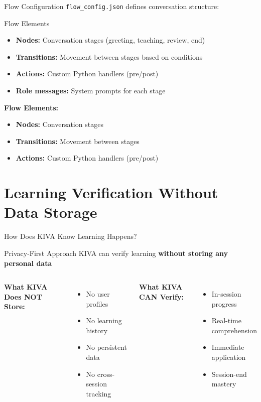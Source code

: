 \documentclass[aspectratio=169]{beamer}
\begin{document}
\begin{frame}{Flow Configuration}
\texttt{flow\_config.json} defines conversation structure:

\begin{block}{Flow Elements}
\begin{itemize}
    \item \textbf{Nodes:} Conversation stages (greeting, teaching, review, end)
    \item \textbf{Transitions:} Movement between stages based on conditions
    \item \textbf{Actions:} Custom Python handlers (pre/post)
    \item \textbf{Role messages:} System prompts for each stage
\end{itemize}
\end{block}

\vspace{0.3cm}
\textbf{Flow Elements:}
\begin{itemize}
    \item \textbf{Nodes:} Conversation stages
    \item \textbf{Transitions:} Movement between stages
    \item \textbf{Actions:} Custom Python handlers (pre/post)
\end{itemize}
\end{frame}

\section{Learning Verification Without Data Storage}

\begin{frame}{How Does KIVA Know Learning Happens?}
\begin{alertblock}{Privacy-First Approach}
KIVA can verify learning \textbf{without storing any personal data}
\end{alertblock}

\vspace{0.3cm}

\begin{columns}[T]
\textbf{What KIVA Does NOT Store:}
\begin{itemize}
    \item No user profiles
    \item No learning history
    \item No persistent data
    \item No cross-session tracking
\end{itemize}

\textbf{What KIVA CAN Verify:}
\begin{itemize}
    \item In-session progress
    \item Real-time comprehension
    \item Immediate application
    \item Session-end mastery
\end{itemize}
\end{columns}
\end{frame}
\end{document}
